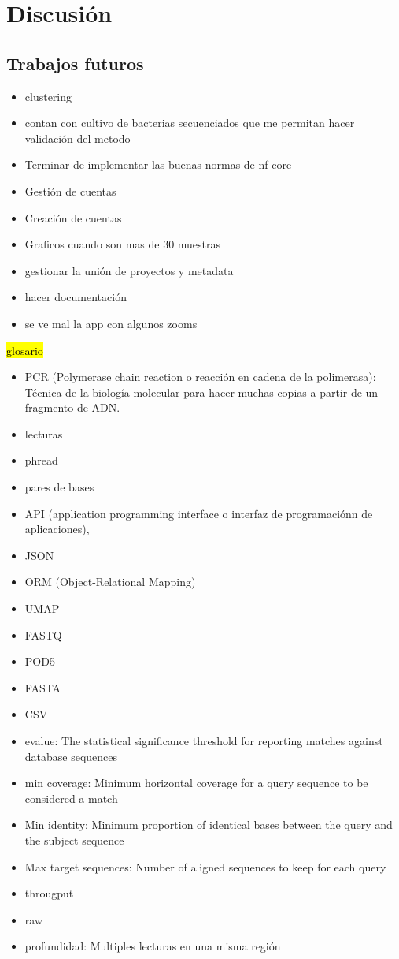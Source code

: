 \chapter{Discusión}
\section{Trabajos futuros}
\begin{itemize}
    \item clustering
    \item contan con cultivo de bacterias secuenciados que me permitan hacer validación del metodo
    \item Terminar de implementar las buenas normas de nf-core
    \item Gestión de cuentas
    \item Creación de cuentas
    \item Graficos cuando son mas de 30 muestras
    \item gestionar la unión de proyectos y metadata
    \item hacer documentación
    \item se ve mal la app con algunos zooms    
\end{itemize}
\hl{glosario}
\begin{itemize}
    \item PCR (Polymerase chain reaction o reacción en cadena de la polimerasa): Técnica de la biología molecular para hacer muchas copias a partir de un fragmento de ADN.
    \item lecturas
    \item phread
    \item pares de bases
    \item API (application programming interface o interfaz de programaciónn de aplicaciones),
    \item JSON
    \item ORM (Object-Relational Mapping)
    \item UMAP
    \item FASTQ
    \item POD5
    \item FASTA
    \item CSV
    \item evalue: The statistical significance threshold for reporting matches against database sequences
    \item min coverage: Minimum horizontal coverage for a query sequence to be considered a match
    \item Min identity: Minimum proportion of identical bases between the query and the subject sequence
    \item Max target sequences: Number of aligned sequences to keep for each query
    \item througput
    \item raw
    \item profundidad: Multiples lecturas en una misma región
\end{itemize}
